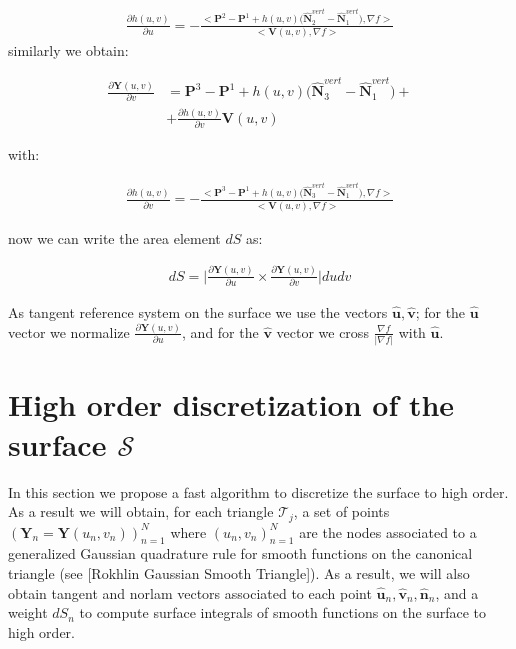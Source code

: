 \documentclass[11pt, oneside]{article}
\newcommand\bn{\boldsymbol n}
\newcommand\bP{\boldsymbol P}
\newcommand\bN{\boldsymbol N}
\newcommand\bY{\boldsymbol Y}
\newcommand\bV{\boldsymbol V}
\newcommand\bu{\boldsymbol u}
\newcommand\bv{\boldsymbol v}
\begin{document}
\begin{equation}\label{U_vector_2}
\begin{aligned}
\frac{\partial h(u,v)}{\partial u}=-\frac{<\bP^2-\bP^1+h(u,v)\Big(\hat{\bN}^{vert}_2-\hat{\bN}^{vert}_1\Big),\nabla f>}{<\bV(u,v),\nabla f>}
\end{aligned}
\end{equation}
similarly we obtain:

\begin{equation}\label{V_vector}
\begin{aligned}
\frac{\partial\bY(u,v)}{\partial v}&=\bP^3-\bP^1+h(u,v)\Big(\hat{\bN}^{vert}_3-\hat{\bN}^{vert}_1\Big)+\\
&+\frac{\partial h(u,v)}{\partial v}\bV(u,v)
\end{aligned}
\end{equation}

with:

\begin{equation}\label{V_vector_2}
\begin{aligned}
\frac{\partial h(u,v)}{\partial v}=-\frac{<\bP^3-\bP^1+h(u,v)\Big(\hat{\bN}^{vert}_3-\hat{\bN}^{vert}_1\Big),\nabla f>}{<\bV(u,v),\nabla f>}
\end{aligned}
\end{equation}


now we can write the area element $dS$ as:

\begin{equation}\label{dS}
\begin{aligned}
 dS=\Bigg|\frac{\partial\bY(u,v)}{\partial u}\times\frac{\partial\bY(u,v)}{\partial v}\Bigg|dudv
\end{aligned}
\end{equation}
  
 
 
As tangent reference system on the surface we use the vectors $\hat{\bu}, \hat{\bv}$; for the  $\hat{\bu}$ vector we normalize $\frac{\partial\bY(u,v)}{\partial u}$, and for the $\hat{\bv}$ vector we cross $\frac{\nabla f}{|\nabla f|}$ with $\hat{\bu}$.

\section{High order discretization of the surface $\mathcal{S}$}\label{disc}
In this section we propose a fast algorithm to discretize the surface to high order. As a result we will obtain, for each triangle $\mathcal{T}_j$, a set of points $(\bY_n=\bY(u_n,v_n))_{n=1}^N$ where $(u_n,v_n)_{n=1}^N$ are the nodes associated to a generalized Gaussian quadrature rule for smooth functions on the canonical triangle (see [Rokhlin Gaussian Smooth Triangle]). As a result, we will also obtain tangent and norlam vectors associated to each point $\hat{\bu}_n,\hat{\bv}_n,\hat{\bn}_n$, and a weight $dS_n$ to compute surface integrals of smooth functions on the surface to high order.
\end{document}
